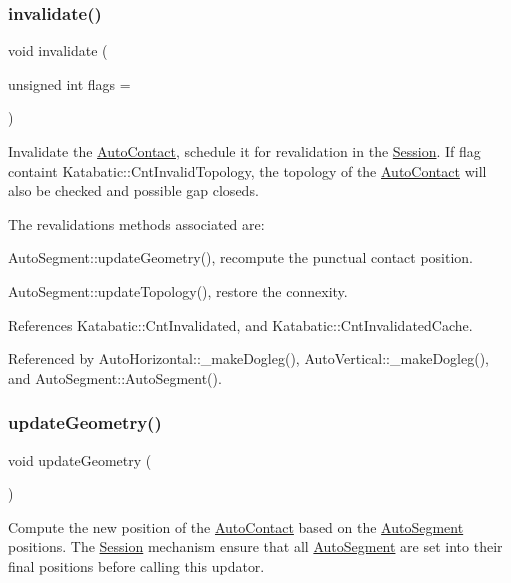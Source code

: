 \subsubsection{\texorpdfstring{invalidate()}{invalidate()}}
{\footnotesize\ttfamily void invalidate (\begin{DoxyParamCaption}\item[{unsigned int}]{flags = {} }\end{DoxyParamCaption})}

Invalidate the \mbox{\hyperlink{classKatabatic_1_1AutoContact}{Auto\+Contact}}, schedule it for revalidation in the \mbox{\hyperlink{classKatabatic_1_1Session}{Session}}. If flag containt Katabatic\+::\+Cnt\+Invalid\+Topology, the topology of the \mbox{\hyperlink{classKatabatic_1_1AutoContact}{Auto\+Contact}} will also be checked and possible gap closeds.

The revalidations methods associated are\+:
\begin{DoxyItemize}
\item Auto\+Segment\+::update\+Geometry(), recompute the punctual contact position.
\item Auto\+Segment\+::update\+Topology(), restore the connexity. 
\end{DoxyItemize}

References Katabatic\+::\+Cnt\+Invalidated, and Katabatic\+::\+Cnt\+Invalidated\+Cache.



Referenced by Auto\+Horizontal\+::\+\_\+make\+Dogleg(), Auto\+Vertical\+::\+\_\+make\+Dogleg(), and Auto\+Segment\+::\+Auto\+Segment().

\mbox{\label{classKatabatic_1_1AutoContact_af6a2454547eeb7f5a519970dcb467e90}} 
\subsubsection{\texorpdfstring{update\+Geometry()}{updateGeometry()}}
{\footnotesize\ttfamily void update\+Geometry (\begin{DoxyParamCaption}{ }\end{DoxyParamCaption})\hspace{0.3cm}{\ttfamily [pure virtual]}}

Compute the new position of the \mbox{\hyperlink{classKatabatic_1_1AutoContact}{Auto\+Contact}} based on the \mbox{\hyperlink{classKatabatic_1_1AutoSegment}{Auto\+Segment}} positions. The \mbox{\hyperlink{classKatabatic_1_1Session}{Session}} mechanism ensure that all \mbox{\hyperlink{classKatabatic_1_1AutoSegment}{Auto\+Segment}} are set into their final positions before calling this updator. 

